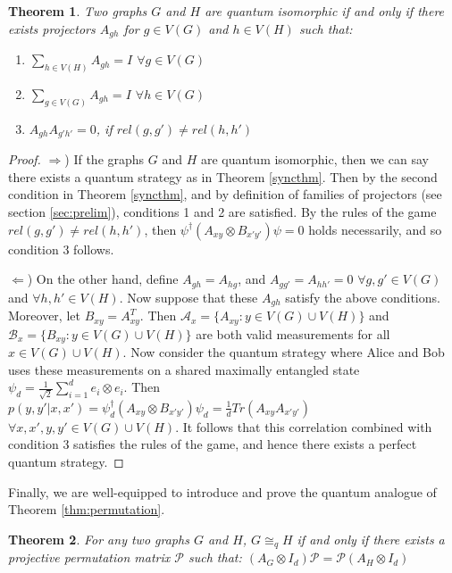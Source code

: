 \documentclass[12pt]{article}
\newtheorem{thm}{Theorem}[section]
\begin{document}
\begin{thm}
  \label{projqiso}
  Two graphs $G$ and $H$ are quantum isomorphic if and only if there
  exists projectors $A_{gh}$ for $g \in V(G)$ and $h \in V(H)$ such
  that:
  \begin{enumerate}
  \item $\sum_{h \in V(H)} A_{gh} = I$ $\forall g \in V(G)$
  \item $\sum_{g \in V(G)} A_{gh} = I$ $\forall h \in V(G)$
  \item $A_{gh}A_{g'h'} = 0$, if $rel(g, g') \neq rel(h, h')$
  \end{enumerate}
\end{thm}

\begin{proof}
$\Rightarrow$) If the graphs $G$ and $H$ are quantum isomorphic, then
  we can say there exists a quantum strategy as in Theorem
  \ref{syncthm}. Then by the second condition in Theorem
  \ref{syncthm}, and by definition of families of projectors (see
  section \ref{sec:prelim}), conditions 1 and 2 are satisfied. By the
  rules of the game $rel(g, g') \neq rel(h, h')$, then $\psi^{\dag}
  (A_{xy} \otimes B_{x'y'}) \psi = 0$ holds necessarily, and so
  condition 3 follows.

$\Leftarrow$) On the other hand, define $A_{gh} = A_{hg}$, and
  $A_{gg'} = A_{hh'} = 0$ $\forall g, g' \in V(G)$ and $\forall h, h'
  \in V(H)$. Now suppose that these $A_{gh}$ satisfy the above
  conditions. Moreover, let $B_{xy} = A_{xy}^T$. Then $\mathcal{A}_x =
  \{A_{xy}: y \in V(G) \cup V(H)\}$ and $\mathcal{B}_x = \{B_{xy}: y
  \in V(G) \cup V(H)\}$ are both valid measurements for all $x \in
  V(G) \cup V(H)$. Now consider the quantum strategy where Alice and
  Bob uses these measurements on a shared maximally entangled state
  $\psi_d = \frac{1}{\sqrt{2}} \sum_{i=1}^d e_i \otimes e_i$. Then
  $p(y, y'|x, x') = \psi^{\dag}_d (A_{xy} \otimes B_{x'y'}) \psi_d=
  \frac{1}{d}Tr(A_{xy}A_{x'y'})$ $\forall x, x', y, y' \in V(G) \cup
  V(H)$. It follows that this correlation combined with condition 3
  satisfies the rules of the game, and hence there exists a perfect
  quantum strategy.
\end{proof}

Finally, we are well-equipped to introduce and prove the quantum
analogue of Theorem \ref{thm:permutation}.

\begin{thm}
  For any two graphs $G$ and $H$, $G \cong_q H$ if and only if there
  exists a projective permutation matrix $\mathcal{P}$ such that:
  $(A_G \otimes I_d)\mathcal{P} = \mathcal{P} (A_H \otimes I_d)$
\end{thm}
\end{document}
